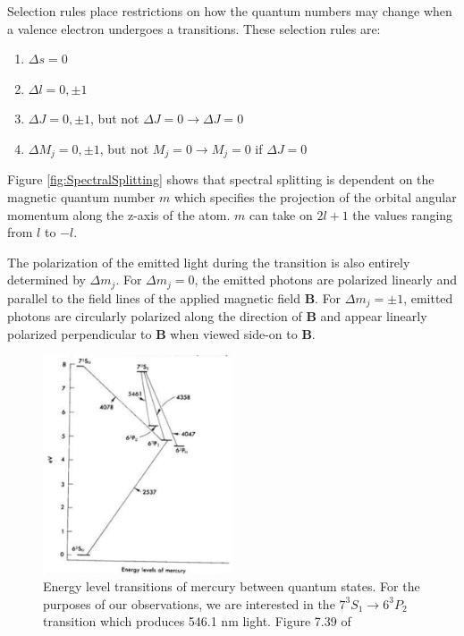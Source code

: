\documentclass[twocolumn]{article}
\begin{document}
		
		Selection rules place restrictions on how the quantum numbers may change when a valence electron undergoes a transitions.
		These selection rules are:
		\begin{enumerate}
			\item $\Delta s = 0$
			\item $\Delta l = 0, \pm1$
			\item $\Delta J = 0, \pm1$, but not $\Delta J = 0 \rightarrow \Delta J = 0$
			\item $\Delta M_j = 0, \pm1$, but not $M_j=0\rightarrow M_j=0$ if $\Delta J = 0$
		\end{enumerate}
		
		Figure \ref{fig:SpectralSplitting} shows that spectral splitting is dependent on the magnetic quantum number $m$ which specifies the projection of the orbital angular momentum along the z-axis of the atom.
		$m$ can take on $2l+1$ the values ranging from $l$ to $-l$.
		
		The polarization of the emitted light during the transition is also entirely determined by $\Delta m_j$.
		For $\Delta m_j = 0$, the emitted photons are polarized linearly and parallel to the field lines of the applied magnetic field $\mathbf{B}$.
		For $\Delta m_j=\pm1$, emitted photons are circularly polarized along the direction of $\mathbf{B}$ and appear linearly polarized perpendicular to $\mathbf{B}$ when viewed side-on to $\mathbf{B}$.
		\begin{figure}
			\centering
			\includegraphics[width=0.5\textwidth]{Images/MercuryEnergyLevelsDiagram.png}
			\caption{Energy level transitions of mercury between quantum states. For the purposes of our observations, we are interested in the $7^3S_1 \rightarrow 6^3P_2$ transition which produces 546.1 nm light. Figure 7.39 of \cite{melissinos_experiments_1966}}
			\label{fig:MercuryEnergyLevelsDiagram}
		\end{figure}
		
\end{document}
